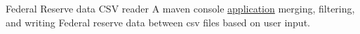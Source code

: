 \datedsubsection{}
{Federal Reserve data CSV reader}
{}
{A maven console \href{https://github.com/jacobarchambault/codeloujava}{application} merging, filtering, and writing Federal reserve data between csv files based on user input.}
